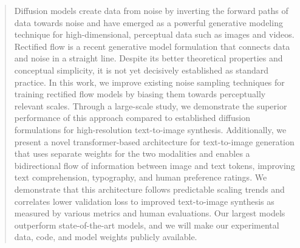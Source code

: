 \begin{abstract}
\vspace{-0.25em} 
Diffusion models create data from noise by inverting the forward paths of data towards noise and have emerged as a powerful generative modeling technique for high-dimensional, perceptual data such as images and videos. Rectified flow is a recent generative model formulation that connects data and noise in a straight line. Despite its better theoretical properties and conceptual simplicity, it is not yet decisively established as standard practice. In this work, we improve existing noise sampling techniques for training rectified flow models by biasing them towards perceptually relevant scales. Through a large-scale study, we demonstrate the superior performance of this approach compared to established diffusion formulations for high-resolution text-to-image synthesis.  Additionally, we present a novel transformer-based architecture for text-to-image generation that uses separate weights for the two modalities and enables a bidirectional flow of information between image and text tokens, improving text comprehension, typography, and human preference ratings. We demonstrate that this architecture follows predictable scaling trends and correlates lower validation loss to improved text-to-image synthesis as measured by various metrics and human evaluations. Our largest models outperform state-of-the-art models, and we will make our experimental data, code, and model weights publicly available.
\vspace{-1.0em}
%


%

%

%
%

%

%
\end{abstract}
